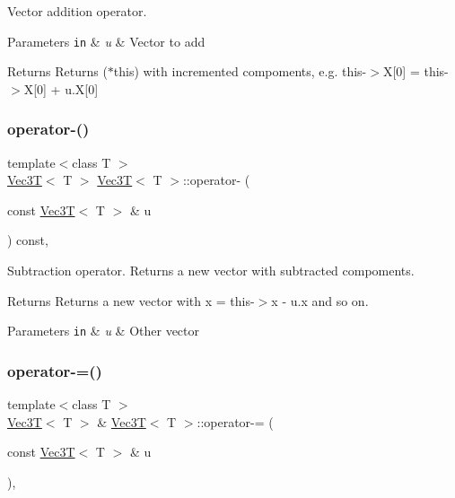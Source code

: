 Vector addition operator. 


\begin{DoxyParams}[1]{Parameters}
\mbox{\tt in}  & {\em u} & Vector to add \\
\hline
\end{DoxyParams}
\begin{DoxyReturn}{Returns}
Returns ($\ast$this) with incremented compoments, e.\+g. this-\/$>$X\mbox{[}0\mbox{]} = this-\/$>$X\mbox{[}0\mbox{]} + u.\+X\mbox{[}0\mbox{]} 
\end{DoxyReturn}
\mbox{\label{classVec3T_ac00a70e55a93ecd8c60d29a129f8fbf3}} 
\subsubsection{\texorpdfstring{operator-\/()}{operator-()}}
{\footnotesize\ttfamily template$<$class T $>$ \\
\hyperlink{classVec3T}{Vec3T}$<$ T $>$ \hyperlink{classVec3T}{Vec3T}$<$ T $>$\+::operator-\/ (\begin{DoxyParamCaption}\item[{const \hyperlink{classVec3T}{Vec3T}$<$ T $>$ \&}]{u }\end{DoxyParamCaption}) const\hspace{0.3cm}{\ttfamily [inline]}, {\ttfamily [noexcept]}}



Subtraction operator. Returns a new vector with subtracted compoments. 

\begin{DoxyReturn}{Returns}
Returns a new vector with x = this-\/$>$x -\/ u.\+x and so on. 
\end{DoxyReturn}

\begin{DoxyParams}[1]{Parameters}
\mbox{\tt in}  & {\em u} & Other vector \\
\hline
\end{DoxyParams}
\mbox{\label{classVec3T_a8a580094450e167248f4ee089027fa40}} 
\subsubsection{\texorpdfstring{operator-\/=()}{operator-=()}}
{\footnotesize\ttfamily template$<$class T $>$ \\
\hyperlink{classVec3T}{Vec3T}$<$ T $>$ \& \hyperlink{classVec3T}{Vec3T}$<$ T $>$\+::operator-\/= (\begin{DoxyParamCaption}\item[{const \hyperlink{classVec3T}{Vec3T}$<$ T $>$ \&}]{u }\end{DoxyParamCaption})\hspace{0.3cm}{\ttfamily [inline]}, {\ttfamily [noexcept]}}



